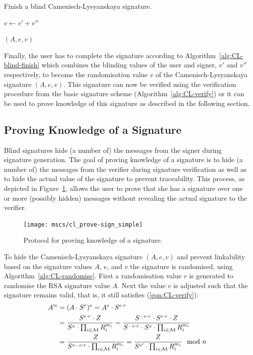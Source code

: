 \begin{algorithm}
  \caption{Finish a blind Camenisch-Lysyanskaya signature.}
  \label{alg:CL-blind-finish}
  \addtolength{\baselineskip}{1mm}
  \begin{algorithmic}[1]
      \State $v \gets v' + v''$

      \Return $(A, e, v)$
    \EndFunction
  \end{algorithmic}
\end{algorithm}

Finally, the user has to complete the signature according to
Algorithm~\ref{alg:CL-blind-finish} which combines the blinding values of the
user and signer, $v'$ and $v''$ respectively, to become the randomisation
value $v$ of the Camenisch-Lysyanskaya signature $(A, e, v)$. This signature can
now be verified using the verification procedure from the basic signature scheme
(Algorithm~\ref{alg:CL-verify}) or it can be used to prove knowledge of this
signature as described in the following section.


\subsection{Proving Knowledge of a Signature\label{sec:cl_proof}}
Blind signatures hide (a number of) the messages from the signer during
signature generation. The goal of proving knowledge of a signature is to hide
(a number of) the messages from the verifier during signature verification as
well as to hide the actual value of the signature to prevent traceability. This
process, as depicted in Figure~\ref{msc:cl_prove-sign}, allows the user to prove
that she has a signature over one or more (possibly hidden) messages without
revealing the actual signature to the verifier.

\begin{figure}[b]
  \centering
  \texttt{[image: mscs/cl\_prove-sign\_simple]}
  \caption{Protocol for proving knowledge of a signature.}
  \label{msc:cl_prove-sign}
\end{figure}

To hide the Camenisch-Lysyanskaya signature $(A, e, v)$ and prevent linkability
based on the signature values $A$, $e$, and $v$ the signature is randomised,
using Algorithm~\ref{alg:CL-randomise}. First a randomisation value $r$ is
generated to randomise the RSA signature value $A$. Next the value $v$ is
adjusted such that the signature remains valid, that is, it still satisfies
(\ref{eqn:CL-verify}):
\begin{align*}
  A'^e
  & = (A \cdot S^r)^e
  = A^e \cdot S^{e \cdot r} \\
  &= \dfrac{S^{e \cdot r} \cdot Z}{S^v \cdot \prod_{i \in \mathcal{M}} R_i^{m_i}}
  = \dfrac{S^{- e \cdot r} \cdot S^{e \cdot r} \cdot Z}{S^{- e \cdot r} \cdot S^v \cdot \prod_{i \in \mathcal{M}} R_i^{m_i}} \\
  &= \dfrac{Z}{S^{v - e \cdot r} \cdot \prod_{i \in \mathcal{M}} R_i^{m_i}}
  = \dfrac{Z}{S^{v'} \cdot \prod_{i \in \mathcal{M}} R_i^{m_i}} \mod n
\end{align*}

